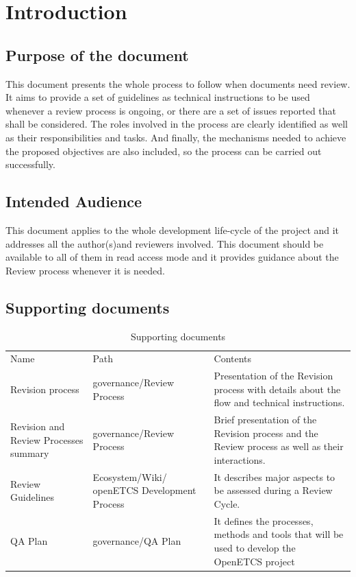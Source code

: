 \documentclass{template/openetcs_article}
\begin{document}
\newpage

\section{Introduction}

\subsection[Introduction]{Purpose of the document}
This document presents the whole process to follow when documents need review. It aims to provide a set of guidelines as technical instructions to be used whenever a review process is ongoing, or there are a set of issues reported that shall be considered. The roles involved in the process are clearly identified as well as their responsibilities and tasks. And finally, the mechanisms needed to achieve the proposed objectives are also included, so the process can be carried out successfully.

\subsection{Intended Audience}
This document applies to the whole development life-cycle of the project and it addresses all the author(s)and reviewers involved. This document should be available to all of them in read access mode and it provides guidance about the Review process whenever it is needed. 

\subsection{Supporting documents}

\begin{table}[H]
\begin{tabular}{|m{3cm}m{}m{}|}
\hline
\rowcolor{myblue}
\multicolumn{3}{|c|}{Supporting documents} \\\hline
\rowcolor{lightgray}
Name &
Path &
Contents
\\\hline
Revision process &
governance/Review Process &
Presentation of the Revision process with details about the flow and technical instructions.
\\\hline
Revision and Review Processes summary &
governance/Review Process &
Brief presentation of the Revision process and the Review process as well as their interactions.
\\\hline
Review Guidelines &
Ecosystem/Wiki/ openETCS Development Process &
It describes major aspects to be assessed during a Review Cycle.
\\\hline
QA Plan & governance/QA Plan & It defines the processes, methods and tools that will be used to develop the OpenETCS project
\\\hline
\end{tabular}
\caption{Supporting documents}
\end{table}
\end{document}
